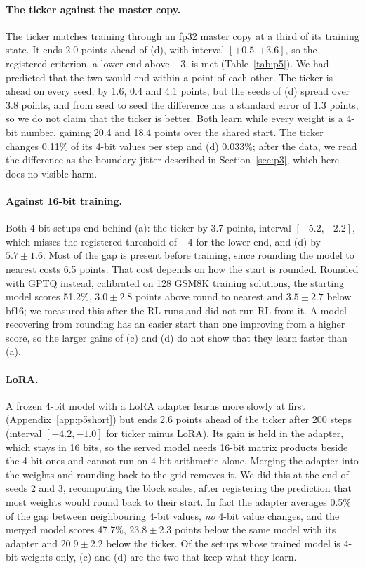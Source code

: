 \documentclass[11pt]{article}
\begin{document}
\paragraph{The ticker against the master copy.} The ticker matches training through an fp32 master copy at a third of
its training state. It ends 2.0 points ahead of (d), with interval $[+0.5, +3.6]$, so the registered criterion, a lower
end above $-3$, is met (Table~\ref{tab:p5}). We had predicted that the two would end within a point of each other. The
ticker is ahead on every seed, by 1.6, 0.4 and 4.1 points, but the seeds of (d) spread over 3.8 points, and from seed
to seed the difference has a standard error of 1.3 points, so we do not claim that the ticker is better. Both learn
while every weight is a 4-bit number, gaining 20.4 and 18.4 points over the shared start. The ticker changes 0.11\% of
its 4-bit values per step and (d) 0.033\%; after the data, we read the difference as the boundary jitter described in
Section~\ref{sec:p3}, which here does no visible harm.

\paragraph{Against 16-bit training.} Both 4-bit setups end behind (a): the ticker by 3.7 points, interval
$[-5.2, -2.2]$, which misses the registered threshold of $-4$ for the lower end, and (d) by $5.7 \pm 1.6$. Most of the
gap is present before training, since rounding the model to nearest costs 6.5 points. That cost depends on how the start
is rounded. Rounded with GPTQ instead, calibrated on 128 GSM8K training solutions, the starting model scores 51.2\%,
$3.0 \pm 2.8$ points above round to nearest and $3.5 \pm 2.7$ below bf16; we measured this after the RL runs and did
not run RL from it. A model recovering from rounding has an easier start than one improving from a higher score, so
the larger gains of (c) and (d) do not show that they learn faster than (a).

\paragraph{LoRA.} A frozen 4-bit model with a LoRA adapter learns more slowly at first (Appendix~\ref{app:p5short})
but ends 2.6 points ahead of the ticker after 200 steps (interval $[-4.2, -1.0]$ for ticker minus LoRA). Its gain is
held in the adapter, which stays in 16 bits, so the served model needs 16-bit matrix products beside the 4-bit ones and
cannot run on 4-bit arithmetic alone. Merging the adapter into the weights and rounding back to the grid removes it. We
did this at the end of seeds 2 and 3, recomputing the block scales, after registering the prediction that most weights
would round back to their start. In fact the adapter averages 0.5\% of the gap between neighbouring 4-bit values,
\emph{no} 4-bit value changes, and the merged model scores 47.7\%, $23.8 \pm 2.3$ points below the same model with its
adapter and $20.9 \pm 2.2$ below the ticker. Of the setups whose trained model is 4-bit weights only, (c) and (d) are
the two that keep what they learn.
\end{document}
